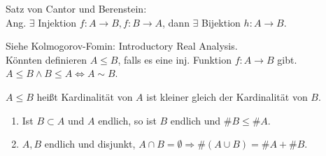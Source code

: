 \documentclass[../ana1.tex]{subfiles}
\begin{document}
\begin{bem}
	Satz von Cantor und Berenstein:\\
	Ang. \(\exists \) Injektion \(f:A\rightarrow B, f:B\rightarrow A\), dann \(\exists \) Bijektion \(h:A\rightarrow B\).
\end{bem}
\begin{bew}
	Siehe Kolmogorov-Fomin: Introductory Real Analysis.\\
	Könnten definieren \(A\leq B\), falls es eine inj. Funktion \(f: A\rightarrow B\) gibt.\\
	\(A\leq B \wedge B\leq A \Leftrightarrow A\sim B\).
\end{bew}

\begin{bem}
	\(A\leq B\) heißt Kardinalität von \(A\) ist kleiner gleich der Kardinalität von \(B\).
	\begin{enumerate}
		\item Ist \(B\subset A\) und \(A\) endlich, so ist \(B\) endlich und \( \#B \leq \# A\).
		\item \(A,B\) endlich und disjunkt, \(A\cap B = \emptyset \Rightarrow \#(A\cup B) = \#A + \#B \).
	\end{enumerate}
\end{bem}
\end{document}
